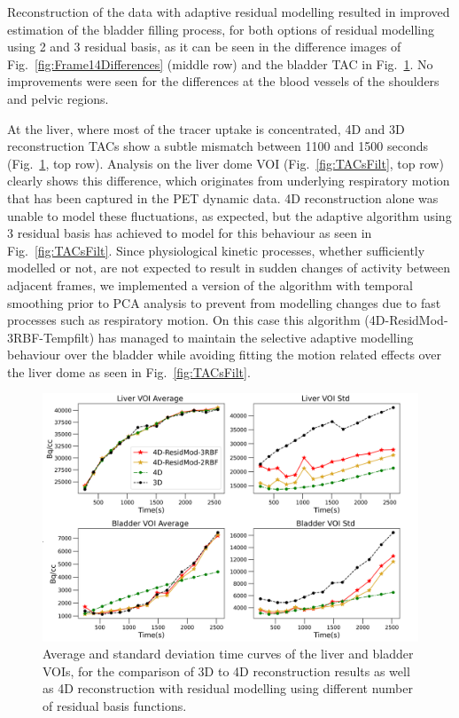 Reconstruction of the data with adaptive residual modelling resulted in improved estimation of the bladder filling process, for both options of residual modelling using 2 and 3 residual basis, as it can be seen in the difference images of Fig.~\ref{fig:Frame14Differences} (middle row) and the bladder TAC in Fig.~\ref{fig:TACs}. 
No improvements were seen for the differences at the blood vessels of the shoulders and pelvic regions. 

At the liver, where most of the tracer uptake is concentrated, 4D and 3D reconstruction TACs show a subtle mismatch between 1100 and 1500 seconds (Fig.~\ref{fig:TACs}, top row). Analysis on the liver dome VOI (Fig.~\ref{fig:TACsFilt}, top row) clearly shows this difference, which originates from underlying respiratory motion that has been captured in the PET dynamic data. 4D reconstruction alone was unable to model these fluctuations, as expected, but the adaptive algorithm using 3 residual basis has achieved to model for this behaviour as seen in Fig.~\ref{fig:TACsFilt}.
Since physiological kinetic processes, whether sufficiently modelled or not, are not expected to result in sudden changes of activity between adjacent frames, we implemented a version of the algorithm with temporal smoothing prior to PCA analysis to prevent from modelling changes due to fast processes such as respiratory motion. On this case this algorithm (4D-ResidMod-3RBF-Tempfilt) has managed to maintain the selective adaptive modelling behaviour over the bladder while avoiding fitting the motion related effects over the liver dome as seen in Fig.~\ref{fig:TACsFilt}. 

\begin{figure} [!htbp]
\centering
\includegraphics[scale=0.64,angle=0]{3_Results/3_4_Residual/figures/TACs.png}
\caption{Average and standard deviation time curves of the liver and bladder VOIs, for the comparison of 3D to 4D reconstruction results as well as 4D reconstruction with residual modelling using different number of residual basis functions.} 
\label{fig:TACs}
\end{figure}

